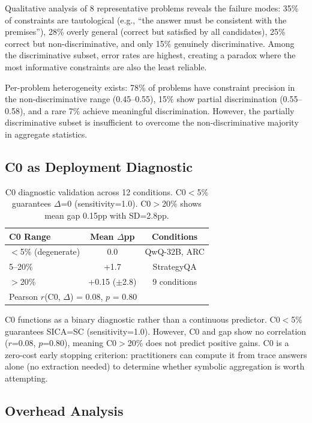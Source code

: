 \documentclass[11pt,a4paper]{article}
\begin{document}
Qualitative analysis of 8 representative problems reveals the failure modes: 35\% of constraints are tautological (e.g., ``the answer must be consistent with the premises''), 28\% overly general (correct but satisfied by all candidates), 25\% correct but non-discriminative, and only 15\% genuinely discriminative. Among the discriminative subset, error rates are highest, creating a paradox where the most informative constraints are also the least reliable.

Per-problem heterogeneity exists: 78\% of problems have constraint precision in the non-discriminative range (0.45--0.55), 15\% show partial discrimination (0.55--0.58), and a rare 7\% achieve meaningful discrimination. However, the partially discriminative subset is insufficient to overcome the non-discriminative majority in aggregate statistics.

\subsection{C0 as Deployment Diagnostic}

\begin{table}[h]
\centering
\small
\caption{C0 diagnostic validation across 12 conditions. C0$<$5\% guarantees $\Delta$=0 (sensitivity=1.0). C0$>$20\% shows mean gap 0.15pp with SD=2.8pp.}
\label{tab:c0}
\begin{tabular}{lcc}
\toprule
C0 Range & Mean $\Delta$pp & Conditions \\
\midrule
$<$5\% (degenerate) & 0.0 & QwQ-32B, ARC \\
5--20\% & +1.7 & StrategyQA \\
$>$20\% & +0.15 ($\pm$2.8) & 9 conditions \\
\midrule
\multicolumn{3}{l}{Pearson $r$(C0, $\Delta$) = 0.08, $p$ = 0.80} \\
\bottomrule
\end{tabular}
\end{table}

C0 functions as a binary diagnostic rather than a continuous predictor. C0$<$5\% guarantees SICA=SC (sensitivity=1.0). However, C0 and gap show no correlation ($r$=0.08, $p$=0.80), meaning C0$>$20\% does not predict positive gains. C0 is a zero-cost early stopping criterion: practitioners can compute it from trace answers alone (no extraction needed) to determine whether symbolic aggregation is worth attempting.

\subsection{Overhead Analysis}
\end{document}
